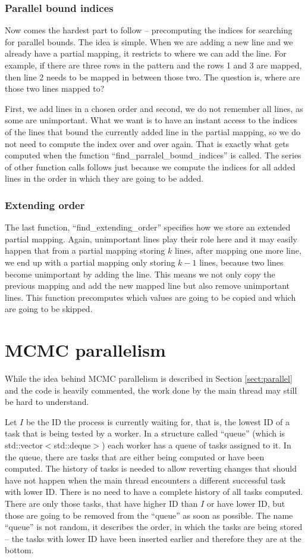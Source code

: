 \subsubsection{Parallel bound indices}
Now comes the hardest part to follow -- precomputing the indices for searching for parallel bounds. The idea is simple. When we are adding a new line and we already have a partial mapping, it restricts to where we can add the line. For example, if there are three rows in the pattern and the rows 1 and 3 are mapped, then line 2 needs to be mapped in between those two. The question is, where are those two lines mapped to?

First, we add lines in a chosen order and second, we do not remember all lines, as some are unimportant. What we want is to have an instant access to the indices of the lines that bound the currently added line in the partial mapping, so we do not need to compute the index over and over again. That is exactly what gets computed when the function ``find\_parralel\_bound\_indices'' is called. The series of other function calls follows just because we compute the indices for all added lines in the order in which they are going to be added.

\subsubsection{Extending order}
The last function, ``find\_extending\_order'' specifies how we store an extended partial mapping. Again, unimportant lines play their role here and it may easily happen that from a partial mapping storing $k$ lines, after mapping one more line, we end up with a partial mapping only storing $k-1$ lines, because two lines become unimportant by adding the line. This means we not only copy the previous mapping and add the new mapped line but also remove unimportant lines. This function precomputes which values are going to be copied and which are going to be skipped.

\section{MCMC parallelism}
While the idea behind MCMC parallelism is described in Section \ref{sect:parallel} and the code is heavily commented, the work done by the main thread may still be hard to understand.

Let $I$ be the ID the process is currently waiting for, that is, the lowest ID of a task that is being tested by a worker. In a structure called ``queue'' (which is std::vector$<$std::deque$>$) each worker has a queue of tasks assigned to it. In the queue, there are tasks that are either being computed or have been computed. The history of tasks is needed to allow reverting changes that should have not happen when the main thread encounters a different successful task with lower ID. There is no need to have a complete history of all tasks computed. There are only those tasks, that have higher ID than $I$ or have lower ID, but those are going to be removed from the ``queue'' as soon as possible. The name ``queue'' is not random, it describes the order, in which the tasks are being stored -- the tasks with lower ID have been inserted earlier and therefore they are at the bottom.

